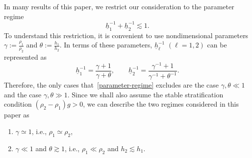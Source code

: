 \documentclass[11pt,leqno]{article}
\numberwithin{equation}{section}
\numberwithin{figure}{section}
\begin{document}
In many results of this paper, we restrict our consideration to the parameter regime 
%
\begin{equation}\label{parameter-regime}
\underline{h}_1^{-1} + \underline{h}_2^{-1} \lesssim 1. 
\end{equation}
%
To understand this restriction, it is convenient to use nondimensional parameters 
$\gamma:=\frac{\rho_1}{\rho_2}$ and $\theta:=\frac{h_1}{h_2}$. 
In terms of these parameters, $\underline{h}_\ell^{-1}$ $(\ell=1,2)$ can be represented as 
%
\[
\underline{h}_1^{-1} = \frac{\gamma+1}{\gamma+\theta}, \qquad
\underline{h}_2^{-1} = \frac{\gamma^{-1}+1}{\gamma^{-1}+\theta^{-1}}.
\]
%
Therefore, the only cases that~\eqref{parameter-regime} excludes are the case $\gamma,\theta \ll 1$ and the case $\gamma,\theta \gg1$. 
Since we shall also assume the stable stratification condition $(\rho_2-\rho_1)g>0$, 
we can describe the two regimes considered in this paper as 
%
\begin{enumerate}
 \item[(i)]
 $\gamma\simeq1$, i.e., $\rho_1\simeq\rho_2$, 
%
 \item[(ii)]
 $\gamma \ll 1$ and $\theta\gtrsim 1$, i.e., $\rho_1\ll\rho_2$ and $h_2\lesssim h_1$. 
\end{enumerate}
\end{document}
